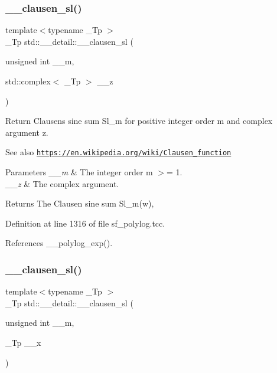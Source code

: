 \subsubsection{\texorpdfstring{\+\_\+\+\_\+clausen\+\_\+sl()}{\_\_clausen\_sl()}\hspace{0.1cm}{\footnotesize\ttfamily [1/2]}}
{\footnotesize\ttfamily template$<$typename \+\_\+\+Tp $>$ \\
\+\_\+\+Tp std\+::\+\_\+\+\_\+detail\+::\+\_\+\+\_\+clausen\+\_\+sl (\begin{DoxyParamCaption}\item[{unsigned int}]{\+\_\+\+\_\+m,  }\item[{std\+::complex$<$ \+\_\+\+Tp $>$}]{\+\_\+\+\_\+z }\end{DoxyParamCaption})}

Return Clausen\textquotesingle{}s sine sum Sl\+\_\+m for positive integer order m and complex argument z. \begin{DoxySeeAlso}{See also}
\href{https://en.wikipedia.org/wiki/Clausen_function}{\tt https\+://en.\+wikipedia.\+org/wiki/\+Clausen\+\_\+function}
\end{DoxySeeAlso}

\begin{DoxyParams}{Parameters}
{\em \+\_\+\+\_\+m} & The integer order m $>$= 1. \\
\hline
{\em \+\_\+\+\_\+z} & The complex argument. \\
\hline
\end{DoxyParams}
\begin{DoxyReturn}{Returns}
The Clausen sine sum Sl\+\_\+m(w), 
\end{DoxyReturn}


Definition at line 1316 of file sf\+\_\+polylog.\+tcc.



References \+\_\+\+\_\+polylog\+\_\+exp().

\mbox{\label{namespacestd_1_1____detail_a554bb352d6397ea5991400eb3734165f}} 
\subsubsection{\texorpdfstring{\+\_\+\+\_\+clausen\+\_\+sl()}{\_\_clausen\_sl()}\hspace{0.1cm}{\footnotesize\ttfamily [2/2]}}
{\footnotesize\ttfamily template$<$typename \+\_\+\+Tp $>$ \\
\+\_\+\+Tp std\+::\+\_\+\+\_\+detail\+::\+\_\+\+\_\+clausen\+\_\+sl (\begin{DoxyParamCaption}\item[{unsigned int}]{\+\_\+\+\_\+m,  }\item[{\+\_\+\+Tp}]{\+\_\+\+\_\+x }\end{DoxyParamCaption})}

